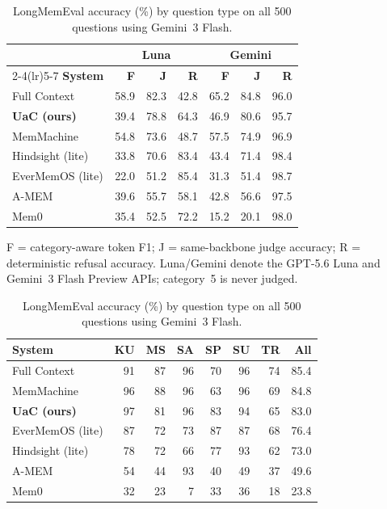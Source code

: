 \begin{table}[t]
\begin{minipage}[t]{0.52\textwidth}
\centering
\caption{Full LOCOMO results (\%) on all 1{,}986 questions. F/J use 1{,}540 answer-bearing questions; R uses 446 adversarial questions.}
\label{tab:locomo}
\footnotesize
\setlength{\tabcolsep}{2pt}
\begin{tabular}{@{}lrrrrrr@{}}
\toprule
 & \multicolumn{3}{c}{\textbf{Luna}} & \multicolumn{3}{c}{\textbf{Gemini}} \\
\cmidrule(lr){2-4}\cmidrule(lr){5-7}
\textbf{System} & \textbf{F} & \textbf{J} & \textbf{R} & \textbf{F} & \textbf{J} & \textbf{R} \\
\midrule
Full Context       & 58.9 & 82.3 & 42.8 & 65.2 & 84.8 & 96.0 \\
\textbf{UaC (ours)} & 39.4 & 78.8 & 64.3 & 46.9 & 80.6 & 95.7 \\
MemMachine         & 54.8 & 73.6 & 48.7 & 57.5 & 74.9 & 96.9 \\
Hindsight (lite)   & 33.8 & 70.6 & 83.4 & 43.4 & 71.4 & 98.4 \\
EverMemOS (lite)   & 22.0 & 51.2 & 85.4 & 31.3 & 51.4 & 98.7 \\
A-MEM              & 39.6 & 55.7 & 58.1 & 42.8 & 56.6 & 97.5 \\
Mem0               & 35.4 & 52.5 & 72.2 & 15.2 & 20.1 & 98.0 \\
\bottomrule
\end{tabular}

\vspace{2pt}
\raggedright F = category-aware token F1; J = same-backbone judge accuracy; R = deterministic refusal accuracy. Luna/Gemini denote the GPT-5.6 Luna and Gemini~3 Flash Preview APIs; category~5 is never judged.\par
\end{minipage}
\hfill
\begin{minipage}[t]{0.46\textwidth}
\centering
\caption{LongMemEval accuracy (\%) by question type on all 500 questions using Gemini~3 Flash.}
\label{tab:longmemeval}
\footnotesize
\setlength{\tabcolsep}{1.5pt}
\begin{tabular}{@{}lrrrrrrr@{}}
\toprule
\textbf{System} & \textbf{KU} & \textbf{MS} & \textbf{SA} & \textbf{SP} & \textbf{SU} & \textbf{TR} & \textbf{All} \\
\midrule
Full Context     & 91 & 87 & 96 & 70 & 96 & 74 & 85.4 \\
MemMachine       & 96 & 88 & 96 & 63 & 96 & 69 & 84.8 \\
\textbf{UaC (ours)} & 97 & 81 & 96 & 83 & 94 & 65 & 83.0 \\
EverMemOS (lite) & 87 & 72 & 73 & 87 & 87 & 68 & 76.4 \\
Hindsight (lite) & 78 & 72 & 66 & 77 & 93 & 62 & 73.0 \\
A-MEM            & 54 & 44 & 93 & 40 & 49 & 37 & 49.6 \\
Mem0             & 32 & 23 &  7 & 33 & 36 & 18 & 23.8 \\
\bottomrule
\end{tabular}


\end{minipage}
\end{table}
